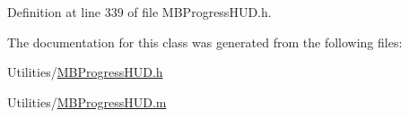 Definition at line 339 of file M\+B\+Progress\+H\+U\+D.\+h.



The documentation for this class was generated from the following files\+:\begin{DoxyCompactItemize}
\item 
Utilities/\hyperlink{_m_b_progress_h_u_d_8h}{M\+B\+Progress\+H\+U\+D.\+h}\item 
Utilities/\hyperlink{_m_b_progress_h_u_d_8m}{M\+B\+Progress\+H\+U\+D.\+m}\end{DoxyCompactItemize}
